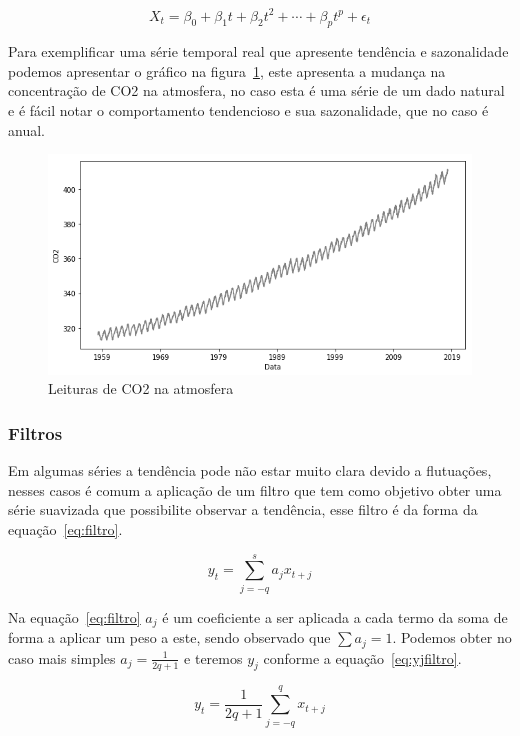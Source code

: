 \documentclass[
	12pt,
	oneside,
	a4paper,
	english,
	brazil
]{abntex2}
\begin{document}
\begin{equation}
    \label{eq:tendenciaSerie}
    X_t = \beta_0 + \beta_1t + \beta_2t^2 + \cdots + \beta_{p}t^p + \epsilon_t
\end{equation}

Para exemplificar uma série temporal real que apresente tendência e sazonalidade 
podemos apresentar o gráfico na figura~\ref{fig:co2}, este apresenta a mudança 
na concentração de CO2 na atmosfera, no caso esta é uma série de um dado natural 
e é fácil notar o comportamento tendencioso e sua sazonalidade, que no caso é 
anual.

\begin{figure}
    \centering
    \caption{Leituras de CO2 na atmosfera}\label{fig:co2}
    \includegraphics[width=.6\linewidth]{images/co2.png}
\end{figure}

\subsubsection{Filtros}

Em algumas séries a tendência pode não estar muito clara devido a flutuações, 
nesses casos é comum a aplicação de um filtro que tem como objetivo obter uma 
série suavizada que possibilite observar a tendência, esse filtro é da forma da 
equação~\ref{eq:filtro}.

\begin{equation}
    \label{eq:filtro}
    y_t = \sum_{j = -q}^{s}{a_{j}x_{t+j}}
\end{equation}

Na equação~\ref{eq:filtro} $a_j$ é um coeficiente a ser aplicada a cada termo da 
soma de forma a aplicar um peso a este, sendo observado que $\sum{a_j} = 1$.
Podemos obter no caso mais simples $a_j = \frac{1}{2q + 1}$ e teremos $y_j$ 
conforme a equação~\ref{eq:yjfiltro}.

\begin{equation}
    \label{eq:yjfiltro}
    y_t = \frac{1}{2q + 1}\sum_{j=-q}^{q}{x_{t+j}}
\end{equation}
\end{document}
